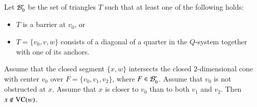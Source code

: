 \bigskip

%


Let ${\mathcal B}_0'$ be the set of triangles $T$ such that at least one
of the following holds:
\begin{itemize}
    \item $T$ is a barrier at $v_0$, or
    \item $T=\{v_0,v,w\}$ consists of a diagonal of a quarter in the
    $Q$-system together with one of its anchors.
\end{itemize}

\begin{lemma} \label{lemma:V-cell-local}
Assume that the closed segment
$\{x,w\}$ intersects the closed $2$-dimensional cone with center
$v_0$ over $F=\{v_0,v_1,v_2\}$, where $F\in{\mathcal B}'_0$. Assume that $v_0$ 
is not obstructed at $x$. Assume that $x$ is closer to $v_0$ 
than to both $v_1$ and $v_2$. Then $x\not\in{\operatorname{VC}}(w)$.
\end{lemma}



